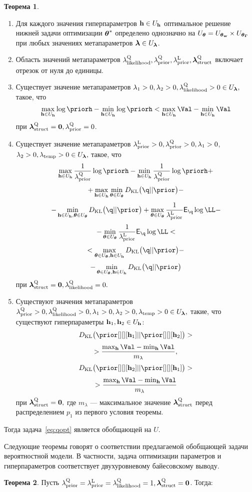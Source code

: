 \documentclass[11pt, a5paper]{dissert}
\theoremstyle{definition}
\newtheorem{theorem}{Теорема}
\begin{document}
{\begin{theorem}
\begin{enumerate}
\item Для каждого значения гиперпараметров $\mathbf{h} \in U_{\mathbf{h}}$ оптимальное решение нижней задачи оптимизации $\boldsymbol{\theta}^{*}$ определено однозначно на $U_{\boldsymbol{\theta}} = U_{\boldsymbol{\theta}_\mathbf{w}} \times U_{\boldsymbol{\theta}_{\boldsymbol{\Gamma}}}$ при любых значениях метапараметров $\boldsymbol{\lambda} \in U_{\boldsymbol{\lambda}}$.

\item Область значений метапараметров $\lambda_\text{likelihood}^\text{Q}, \lambda_\text{prior}^\text{Q}, \lambda_\text{prior}^\text{L}, \boldsymbol{\lambda}_\text{struct}^\text{Q}$ включает отрезок от нуля до единицы.

\item Существует значение метапараметров $\lambda_1>0, \lambda_2>0, \lambda_\text{likelihood}^\text{Q}>0  \in U_{\boldsymbol{\lambda}},$ такое, что
\[
\max_{\h \in \Uh} \log \priorh -\min_{\h \in \Uh}\log \priorh < \max_{\h \in \Uh} \Val - \min_{\h \in \Uh} \Val
\] 
при $\boldsymbol{\lambda}_\text{struct}^\text{Q} = \mathbf{0}, \lambda_\text{prior}^\text{Q} = 0$.

\item Существует значение метапараметров $\lambda_\text{prior}^\text{L}>0, \lambda_\text{prior}^\text{Q}>0, \lambda_1>0$, $\lambda_2>0, \lambda_{\text{temp}}>0 \in U_{\boldsymbol{\lambda}},$ такое, что 
\[
    \max_{\h \in \Uh} \frac{1}{\lamCQ}\log  \priorh - \min_{\h \in \Uh} \frac{1}{\lamCQ}\log  \priorh +
\]
\[
 + \max_{\h \in \Uh} \min_{\teta \in \Uteta} \KL{\q}{\prior} -
\]
\[ -\min_{\h \in \Uh, \teta \in \Uteta}  \KL{\q}{\prior} + \max_{\teta \in \Uteta}\frac{1}{\lamCL}\E_{\q} \log \LL - 
\]
\[
 - \min_{\teta \in \Uteta}\frac{1}{\lamCL}\E_{\q} \log \LL  <
\]
\[ 
< \max_{\teta \in \Uteta, \h \in \Uh} \KL{\q}{\prior} -
\]
\[
-\min_{\teta \in \Uteta, \h \in \Uh} \KL{\q}{\prior}
\]
при $\boldsymbol{\lambda}_\text{struct}^\text{Q} = \mathbf{0}, \lambda_\text{likelihood}^\text{Q} = 0.$

\item Существуют значения метапараметров $\lambda_\text{prior}^\text{Q}>0,\lambda_\text{likelihood}^\text{Q}>0, \lambda_1>0, \lambda_2>0, \lambda_{\text{temp}}>0  \in U_{\boldsymbol{\lambda}},$ такие, что существуют гиперпараметры $\mathbf{h}_1, \mathbf{h}_2 \in U_{\mathbf{h}}$:
\[
\KL{\prior[][][\h_1]}{\prior[][][\h_2]} > 
\]
\[
>\frac{\max_{\h} \Val - \min_{\h} \Val }{m_{\lambda}},
\]
\[
\KL{\prior[][][\h_2]}{\prior[][][\h_1]} >
\]
\[
> \frac{\max_{\h} \Val - \min_{\h} \Val }{m_{\lambda}}
\]
при $\boldsymbol{\lambda}_\text{struct}^\text{Q} = \mathbf{0},$ где $m_{\lambda}$ --- максимальное значение $\boldsymbol{\lambda}_\text{struct}^\text{Q}$ перед распределением $p_1$ из первого условия теоремы.

\end{enumerate}
Тогда задача~\eqref{eq:qopt} является обобщающей на $U$.
\end{theorem}



Следующие теоремы говорят о соответствии предлагаемой обобщающей задачи вероятностной модели. В частности, задача оптимизации параметров и гиперпараметров соответствует двухуровневому байесовскому выводу.
~\\
\begin{theorem}
Пусть ${\lambda_\text{prior}^\text{Q}} = \lambda_\text{prior}^\text{L}=\lambda_\text{likelihood}^\text{Q} = 1, \boldsymbol{\lambda}_\text{struct}^\text{Q}=\mathbf{0}$. Тогда:


\end{theorem}}
\end{document}

